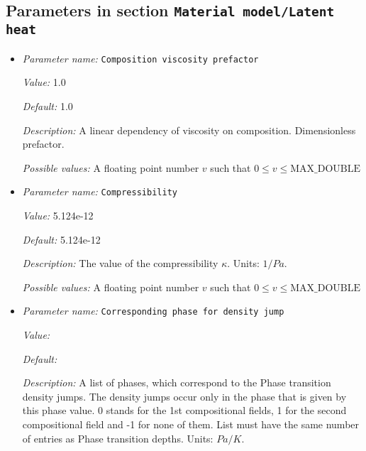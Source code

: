 \subsection{Parameters in section \tt Material model/Latent heat}
\label{parameters:Material_20model/Latent_20heat}

\begin{itemize}
\item {\it Parameter name:} {\tt Composition viscosity prefactor}
\label{parameters:Material model/Latent heat/Composition viscosity prefactor}


{\it Value:} 1.0


{\it Default:} 1.0


{\it Description:} A linear dependency of viscosity on composition. Dimensionless prefactor.


{\it Possible values:} A floating point number $v$ such that $0 \leq v \leq \text{MAX\_DOUBLE}$
\item {\it Parameter name:} {\tt Compressibility}
\label{parameters:Material model/Latent heat/Compressibility}


{\it Value:} 5.124e-12


{\it Default:} 5.124e-12


{\it Description:} The value of the compressibility $\kappa$. Units: $1/Pa$.


{\it Possible values:} A floating point number $v$ such that $0 \leq v \leq \text{MAX\_DOUBLE}$
\item {\it Parameter name:} {\tt Corresponding phase for density jump}
\label{parameters:Material model/Latent heat/Corresponding phase for density jump}


{\it Value:} 


{\it Default:} 


{\it Description:} A list of phases, which correspond to the Phase transition density jumps. The density jumps occur only in the phase that is given by this phase value. 0 stands for the 1st compositional fields, 1 for the second compositional field and -1 for none of them. List must have the same number of entries as Phase transition depths. Units: $Pa/K$.



\end{itemize}
